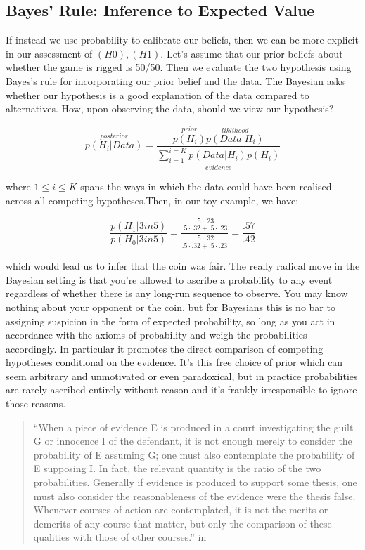 \documentclass[]{tufte-book}
\theoremstyle{definition}
\theoremstyle{definition}
\theoremstyle{definition}
\theoremstyle{remark}
\begin{document}
\hypertarget{bayes-rule-inference-to-expected-value}{%
\subsection{Bayes' Rule: Inference to Expected Value}\label{bayes-rule-inference-to-expected-value}}

If instead we use probability to calibrate our beliefs, then we can be more explicit in our assessment of \((H0), (H1)\). Let's assume that our prior beliefs about whether the game is rigged is 50/50. Then we evaluate the two hypothesis using Bayes's rule for incorporating our prior belief and the data. The Bayesian asks whether our hypothesis is a good explanation of the data compared to alternatives. How, upon observing the data, should we view our hypothesis?

\[ \overset{posterior}{p(H_{i} | Data)} = \frac{\overset{prior}{p(H_{i})}\overset{liklihood}{p(Data | H_{i})}}{\underset{evidence}{\sum_{i=1}^{i =K} p(Data | H_{i})p(H_i)}}\]

where \(1 \leq i \leq K\) spans the ways in which the data could have been realised across all competing hypotheses.Then, in our toy example, we have:

\[ \frac{p(H_1 | 3 in 5)}{p(H_{0} | 3 in 5)} = \frac{\frac{.5\cdot .23}{.5\cdot .32 + .5 \cdot .23}}{\frac{.5\cdot .32}{.5\cdot .32 + .5 \cdot .23}} = \frac{.57}{.42} \]

which would lead us to infer that the coin was fair. The really radical move in the Bayesian setting is that you're allowed to ascribe a probability to any event regardless of whether there is any long-run sequence to observe. You may know nothing about your opponent or the coin, but for Bayesians this is no bar to assigning suspicion in the form of expected probability, so long as you act in accordance with the axioms of probability and weigh the probabilities accordingly. In particular it promotes the direct comparison of competing hypotheses conditional on the evidence. It's this free choice of prior which can seem arbitrary and unmotivated or even paradoxical, but in practice probabilities are rarely ascribed entirely without reason and it's frankly irresponsible to ignore those reasons.

\begin{quote}
``When a piece of evidence E is produced in a court investigating the guilt G or innocence I of the defendant, it is not enough merely to consider the probability of E assuming G; one must also contemplate the probability of E supposing I. In fact, the relevant quantity is the ratio of the two probabilities. Generally if evidence is produced to support some thesis, one must also consider the reasonableness of the evidence were the thesis false. Whenever courses of action are contemplated, it is not the merits or demerits of any course that matter, but only the comparison of these qualities with those of other courses.'' in \citep{LindleyTea}
\end{quote}
\end{document}
